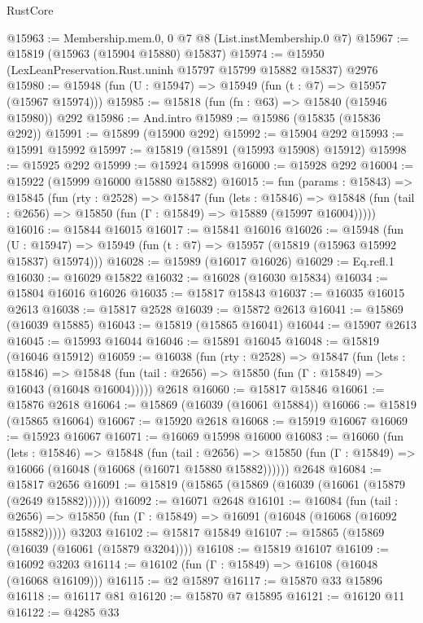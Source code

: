\begin{lexlean}{RustCore}
\begin{coremodule}
@15963 := Membership.mem.{0, 0} @7 @8 (List.instMembership.{0} @7)
@15967 := @15819 (@15963 (@15904 @15880) @15837)
@15974 := @15950 (LexLeanPreservation.Rust.uninh @15797 @15799 @15882 @15837) @2976
@15980 := @15948 (fun (U : @15947) => @15949 (fun (t : @7) => @15957 (@15967 @15974)))
@15985 := @15818 (fun (fn : @63) => @15840 (@15946 @15980)) @292
@15986 := And.intro
@15989 := @15986 (@15835 (@15836 @292))
@15991 := @15899 (@15900 @292)
@15992 := @15904 @292
@15993 := @15991 @15992
@15997 := @15819 (@15891 (@15993 @15908) @15912)
@15998 := @15925 @292
@15999 := @15924 @15998
@16000 := @15928 @292
@16004 := @15922 (@15999 @16000 @15880 @15882)
@16015 := fun (params : @15843) =>
  @15845
    (fun (rty : @2528) =>
    @15847
      (fun (lets : @15846) =>
      @15848 (fun (tail : @2656) => @15850 (fun (Γ : @15849) => @15889 (@15997 @16004)))))
@16016 := @15844 @16015
@16017 := @15841 @16016
@16026 := @15948
    (fun (U : @15947) => @15949 (fun (t : @7) => @15957 (@15819 (@15963 @15992 @15837) @15974)))
@16028 := @15989 (@16017 @16026)
@16029 := Eq.refl.{1}
@16030 := @16029 @15822
@16032 := @16028 (@16030 @15834)
@16034 := @15804 @16016 @16026
@16035 := @15817 @15843
@16037 := @16035 @16015 @2613
@16038 := @15817 @2528
@16039 := @15872 @2613
@16041 := @15869 (@16039 @15885)
@16043 := @15819 (@15865 @16041)
@16044 := @15907 @2613
@16045 := @15993 @16044
@16046 := @15891 @16045
@16048 := @15819 (@16046 @15912)
@16059 := @16038
    (fun (rty : @2528) =>
    @15847
      (fun (lets : @15846) =>
      @15848 (fun (tail : @2656) => @15850 (fun (Γ : @15849) => @16043 (@16048 @16004)))))
    @2618
@16060 := @15817 @15846
@16061 := @15876 @2618
@16064 := @15869 (@16039 (@16061 @15884))
@16066 := @15819 (@15865 @16064)
@16067 := @15920 @2618
@16068 := @15919 @16067
@16069 := @15923 @16067
@16071 := @16069 @15998 @16000
@16083 := @16060
    (fun (lets : @15846) =>
    @15848
      (fun (tail : @2656) =>
      @15850 (fun (Γ : @15849) => @16066 (@16048 (@16068 (@16071 @15880 @15882))))))
    @2648
@16084 := @15817 @2656
@16091 := @15819 (@15865 (@15869 (@16039 (@16061 (@15879 (@2649 @15882))))))
@16092 := @16071 @2648
@16101 := @16084
    (fun (tail : @2656) => @15850 (fun (Γ : @15849) => @16091 (@16048 (@16068 (@16092 @15882)))))
    @3203
@16102 := @15817 @15849
@16107 := @15865 (@15869 (@16039 (@16061 (@15879 @3204))))
@16108 := @15819 @16107
@16109 := @16092 @3203
@16114 := @16102 (fun (Γ : @15849) => @16108 (@16048 (@16068 @16109)))
@16115 := @2 @15897
@16117 := @15870 @33 @15896
@16118 := @16117 @81
@16120 := @15870 @7 @15895
@16121 := @16120 @11
@16122 := @4285 @33

\end{coremodule}
\end{lexlean}
